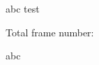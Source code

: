 \documentclass{ltx-talk}
\begin{document}
\begin{frame}
  abc
  \pause
  test
\end{frame}

\begin{frame}
  Total frame number: 
\end{frame}

\begin{frame}
  abc
\end{frame}
\end{document}
